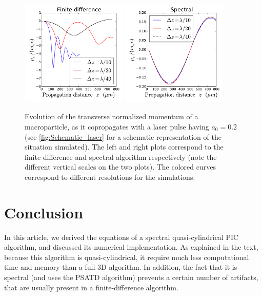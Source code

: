 \documentclass[1p,times,authoryear]{elsarticle}
\begin{document}
\begin{figure}[!h]
\centering
\includegraphics[width=0.45\textwidth]{figures/Laser_finite-difference.pdf}
\includegraphics[width=0.45\textwidth]{figures/Laser_spectral.pdf}
\caption{\label{fig:Laser}Evolution of the transverse normalized
  momentum of a macroparticle, as it copropagates with a
  laser pulse having $a_0 = 0.2$ (see \cref{fig:Schematic_laser} for a
  schematic representation of the situation simulated). The left and
  right plots correspond to the finite-difference and spectral
  algorithm respectively (note the different vertical scales on the two
  plots). The colored curves correspond to different resolutions for the simulations.}
\end{figure}


\section*{Conclusion}

In this article, we derived the equations of a spectral
quasi-cylindrical PIC algorithm, and discussed its numerical
implementation. As explained in the text, because this algorithm is
quasi-cylindrical, it require much less computational
time and memory than a full 3D algorithm. In addition, the fact
that it is spectral (and uses the PSATD algorithm) prevents a certain number of
artifacts, that are usually present in a finite-difference algorithm.
\end{document}
